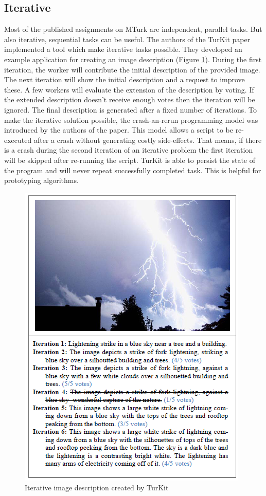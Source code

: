 \subsection{Iterative}
\label{iterative}
Most of the published assignments on MTurk are independent, parallel tasks. But also iterative, sequential tasks can be useful. The authors of the TurKit paper \cite{turkit} implemented a tool which make iterative tasks possible. They developed an example application for creating an image description (Figure \ref{turkit}). During the first iteration, the worker will contribute the initial description of the provided image. The next iteration will show the initial description and a request to improve these. A few workers will evaluate the extension of the description by voting. If the extended description doesn't receive enough votes then the iteration will be ignored. The final description is generated after a fixed number of iterations. To make the iterative solution possible, the crash-an-rerun programming model was introduced by the authors of the paper. This model allows a script to be re-executed after a crash without generating costly side-effects. That means, if there is a crash during the second iteration of an iterative problem the first iteration will be skipped after re-running the script. TurKit is able to persist the state of the program and will never repeat successfully completed task. This is helpful for prototyping algorithms.
\begin{figure}
\centering
\includegraphics[scale=0.65]{images/turkit_description_example.png}
\caption{Iterative image description created by TurKit}
\label{turkit}
\end{figure}

